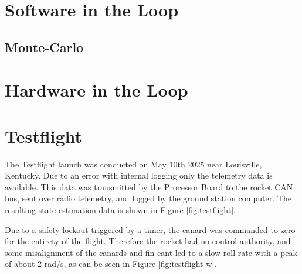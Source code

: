 \section{Software in the Loop}

\subsection{Monte-Carlo}

\section{Hardware in the Loop}

\clearpage
\section{Testflight}
The Testflight launch was conducted on May 10th 2025 near Louisville, Kentucky.
Due to an error with internal logging only the telemetry data is available. This data was transmitted by the Processor Board to the rocket CAN bus, sent over radio telemetry, and logged by the ground station computer.
The resulting state estimation data is shown in Figure \ref{fig:testflight}.

Due to a safety lockout triggered by a timer, the canard was commanded to zero for the entirety of the flight.
Therefore the rocket had no control authority, and some misalignment of the canards and fin cant led to a slow roll rate with a peak of about 2 rad/s, as can be seen in Figure \ref{fig:testflight-w}.


